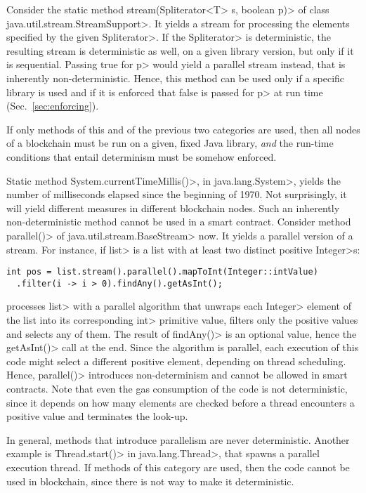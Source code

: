 Consider the static method
\<stream(Spliterator$\text{<}$T$\text{>}$ s, boolean p)>
of class \<java.util.stream.StreamSupport>. It
yields a stream for processing the elements specified by
the given \<Spliterator>. If the \<Spliterator> is deterministic,
the resulting stream is deterministic as well,
on a given library version, but only if it is sequential.
Passing true for \<p> would yield a parallel stream instead, that is
inherently non-deterministic.
Hence, this method can be used only if a specific library is used and
if it is enforced that false is passed for \<p> at run time (Sec.~\ref{sec:enforcing}).

If only methods of this and of the previous two categories are used, then
all nodes of a blockchain must be run on a given, fixed Java library, \emph{and}
the run-time conditions that entail determinism must be somehow enforced.

Static method \<System.currentTimeMillis()>, in \<java.lang.System>,
yields the number of milliseconds elapsed since the beginning of 1970.
Not surprisingly, it will yield different measures in different blockchain nodes.
Such an inherently non-deterministic method cannot be used in a smart contract.
Consider method \<parallel()> of \<java.util.stream.BaseStream> now.
It yields a parallel version of a stream. For instance, if \<list> is a list with
at least two distinct positive \<Integer>s:
%
\begin{verbatim}
int pos = list.stream().parallel().mapToInt(Integer::intValue)
  .filter(i -> i > 0).findAny().getAsInt();
\end{verbatim}
%
processes \<list> with a parallel algorithm
that unwraps each \<Integer> element of the list into its corresponding \<int> primitive value,
filters only the positive values and selects any of them.
The result of \<findAny()> is an optional value, hence the
\<getAsInt()> call at the end. Since the algorithm is
parallel, each execution of this code might select a different
positive element, depending on thread scheduling. Hence, \<parallel()>
introduces non-determinism and
cannot be allowed in smart contracts. Note that even the gas consumption
of the code is not deterministic, since it depends on how many elements
are checked before a thread encounters a positive value and terminates
the look-up.

In general, methods that introduce parallelism are never deterministic.
Another example is \<Thread.start()> in \<java.lang.Thread>, that spawns
a parallel execution thread.
If methods of this category are used, then the code cannot be used in blockchain,
since there is not way to make it deterministic.
